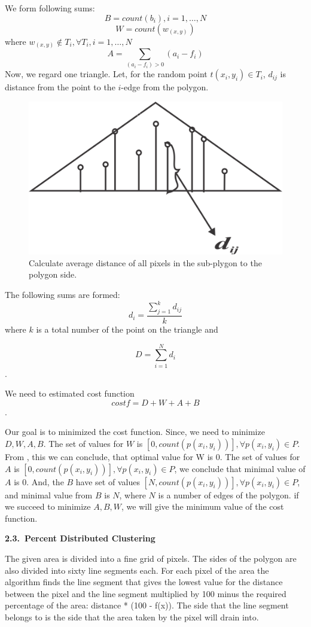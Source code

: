 \documentclass[11pt,leqno]{book}
\newcommand{\subsect}[1]{\vskip 3mm\par{\bf#1}}
\begin{document}
We form following sums:
$$B= count( b_i), i =1, \ldots, N$$
$$ W= count(w_{(x,y)})$$ where $w_{ (x,y)}\notin T_i, \forall{ T_i}, i=1, \dots, N$
$$ A= \sum_{(a_i - f_i)>0}(a_i-f_i)$$
Now, we regard one triangle.  Let, for the random point $t(x_i, y_i) \in T_i$,  $d_{ij}$  is distance from the point to the $i$-edge from the polygon. 

\begin{figure}
  \centering
  \includegraphics[width=.5\linewidth]{pic06.png}
  \caption{Calculate average distance of all pixels in the sub-plygon to the polygon side.}
\label{fig:four}
\end{figure}

The  following sums are formed: $$d_i = \frac{\sum_{j=1}^k d_{ij}}k$$
where $k$ is a  total number of the point on the triangle  and

$$D = \sum_{i=1}^N d_i$$.

We need to estimated cost function
$$cost f = D+W + A + B$$.

Our goal is to minimized the cost function. Since, we need to minimize $D, W, A, B$. The set of values for $W$ is $[0, count( p(x_i, y_i))], \forall p(x_i, y_i) \in P$. From , this we can conclude, that optimal value for W is 0.
The set of values for $A$ is $[0, count (p(x_i, y_i))], \forall p(x_i, y_i) \in P$, we conclude that minimal value of $A$ is 0. And, the $B$ have set of values $[N,count( p(x_i, y_i))], \forall p(x_i, y_i) \in P$, and minimal value from $B$ is $N$, where $N$ is a number of edges of the polygon.
if we succeed to minimize $A, B, W$, we will give the minimum value of the cost function.

\subsect{2.3.~Percent Distributed Clustering}

The given area is divided into a fine grid of pixels. The sides of the polygon are also divided into sixty line segments each. For each pixel of the area the algorithm finds the line segment that gives the lowest value for the distance between the pixel and the line segment multiplied by 100 minus the required percentage of the area: distance * (100 - f(x)). The side that the line segment belongs to is the side that the area taken by the pixel will drain into.
\end{document}
